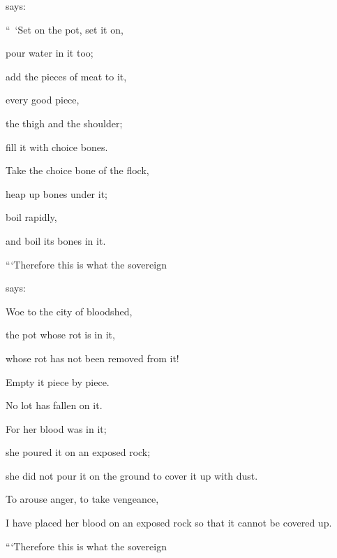 {{}
says:
\par }{\Q “ ‘Set on
the pot,
set
it on,
\par }{\Q pour
water
in it too;
\par }{\Q {}add
the pieces
of meat to
it,
\par }{\Q every
good
piece,
\par }{\Q the thigh
and the shoulder;
\par }{\Q fill
it with choice
bones.
\par }{\Q {}Take
the choice
bone of the flock,
\par }{\Q heap up
bones
under
it;
\par }{\Q boil
rapidly,
\par }{\Q and
boil
its bones
in it.
\par }{\Q {}“‘Therefore
this is what
the sovereign

{}
says:
\par }{\Q Woe
to the city
of bloodshed,
\par }{\Q the pot
whose
rot
is in it,
\par }{\Q whose rot
has not
been removed
from
it!
\par }{\Q Empty it piece
by piece.
\par }{\Q No
lot
has fallen
on it.
\par }{\Q {}For
her blood
was in it;
\par }{\Q she poured
it on
an exposed
rock;
\par }{\Q she did not
pour
it on
the ground
to cover
it up with dust.
\par }{\Q {}To arouse
anger,
to take vengeance,
\par }{\Q I have placed
her blood
on
an exposed
rock
so that it cannot be covered up.
\par }{\Q {}“‘Therefore
this is what
the sovereign

}
